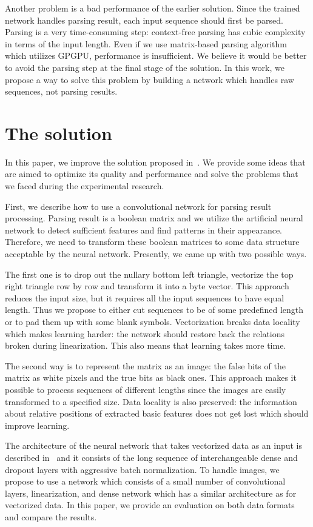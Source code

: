 \documentclass[runningheads]{llncs}
\begin{document}
Another problem is a bad performance of the earlier solution.
Since the trained network handles parsing result, each input sequence should first be parsed.
Parsing is a very time-consuming step: context-free parsing has cubic complexity in terms of the input length.
Even if we use matrix-based parsing algorithm~\cite{Azimov:2018:CPQ:3210259.3210264} which utilizes GPGPU, performance is insufficient.
We believe it would be better to avoid the parsing step at the final stage of the solution.
In this work, we propose a way to solve this problem by building a network which handles raw sequences, not parsing results.

\section{The solution}
In this paper, we improve the solution proposed in~\cite{grigorevcomposition}. We provide some ideas that are aimed to optimize its quality and performance and solve the problems that we faced during the experimental research.

First, we describe how to use a convolutional network for parsing result processing. Parsing result is a boolean matrix and we utilize the artificial neural network to detect sufficient features and find patterns in their appearance.
Therefore, we need to transform these boolean matrices to some data structure acceptable by the neural network.
Presently, we came up with two possible ways.

The first one is to drop out the nullary bottom left triangle, vectorize the top right triangle row by row and transform it into a byte vector.
This approach reduces the input size, but it requires all the input sequences to have equal length.
Thus we propose to either cut sequences to be of some predefined length or to pad them up with some blank symbols.
Vectorization breaks data locality which makes learning harder: the network should restore back the relations broken during linearization.
This also means that learning takes more time.

The second way is to represent the matrix as an image: the false bits of the matrix as white pixels and the true bits as black ones.
This approach makes it possible to process sequences of different lengths since the images are easily transformed to a specified size.
Data locality is also preserved: the information about relative positions of extracted basic features does not get lost which should improve learning.

The architecture of the neural network that takes vectorized data as an input is described in~\cite{grigorevcomposition} and it consists of the long sequence of interchangeable dense and dropout layers with aggressive batch normalization. To handle images, we propose to use a network which consists of a small number of convolutional layers, linearization, and dense network which has a similar architecture as for vectorized data.
In this paper, we provide an evaluation on both data formats and compare the results.
\end{document}
